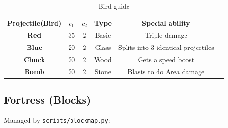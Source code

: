 \documentclass[11pt, a4paper]{article}
\begin{document}
\begin{table}[]

    \centering
    
    \begin{tabular}{|c||c|c|c|c|c|}
    
        \hline    
        \textbf{Projectile(Bird)}   & \textbf{$c_1$} & \textbf{$c_2$} & \textbf{Type} & \textbf{Special ability}\\
        \hline
        \textbf{Red}   & 35\footnotemark & 2 & Basic & Triple damage\\
        \hline
        \textbf{Blue}  & 20 & 2 & Glass & Splits into 3 identical projectiles\\
        \hline
        \textbf{Chuck} & 20 & 2 & Wood & Gets a speed boost\\
        \hline
        \textbf{Bomb}  & 20 & 2 & Stone & Blasts to do Area damage\\
        \hline
    
    \end{tabular}
    
    \caption{Bird guide}
    
    \label{tab:my_label}
    
\end{table}


\subsection{Fortress (Blocks)}

Managed by \texttt{scripts/blockmap.py}:
\end{document}
